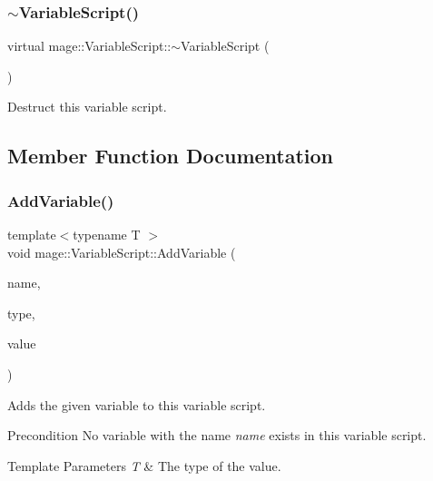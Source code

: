 \subsubsection{\texorpdfstring{$\sim$\+Variable\+Script()}{~VariableScript()}}
{\footnotesize\ttfamily virtual mage\+::\+Variable\+Script\+::$\sim$\+Variable\+Script (\begin{DoxyParamCaption}{ }\end{DoxyParamCaption})\hspace{0.3cm}{\ttfamily [virtual]}}

Destruct this variable script. 

\subsection{Member Function Documentation}
\hypertarget{classmage_1_1_variable_script_aa9a8bb9b6133ce853052820961320ca9}{}\label{classmage_1_1_variable_script_aa9a8bb9b6133ce853052820961320ca9} 
\subsubsection{\texorpdfstring{Add\+Variable()}{AddVariable()}}
{\footnotesize\ttfamily template$<$typename T $>$ \\
void mage\+::\+Variable\+Script\+::\+Add\+Variable (\begin{DoxyParamCaption}\item[{const string \&}]{name,  }\item[{\hyperlink{namespacemage_a530428e73bac0ba7fe84b29086a9e33a}{Variable\+Type}}]{type,  }\item[{const T $\ast$}]{value }\end{DoxyParamCaption})}

Adds the given variable to this variable script.

\begin{DoxyPrecond}{Precondition}
No variable with the name {\itshape name} exists in this variable script. 
\end{DoxyPrecond}

\begin{DoxyTemplParams}{Template Parameters}
{\em T} & The type of the value. \\
\hline
\end{DoxyTemplParams}

